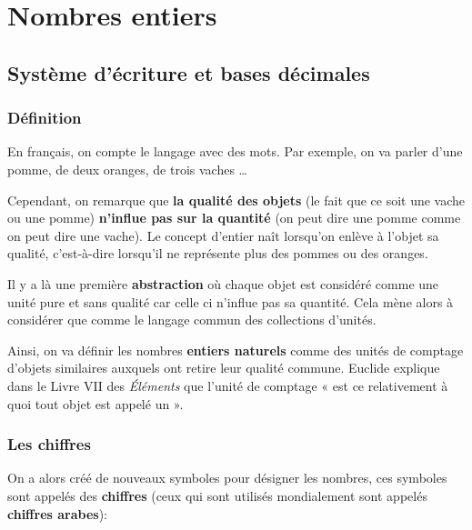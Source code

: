 \chapter{Nombres entiers}

\section{Système d'écriture et bases décimales}

\subsection{Définition}
En français, on compte le langage avec des mots.
Par exemple, on va parler d'une pomme, de deux oranges, de trois vaches \dots

Cependant, on remarque que \textbf{la qualité des objets} (le fait que ce soit une vache ou une pomme) \textbf{n'influe pas sur la quantité} (on peut dire une pomme comme on peut dire une vache). Le concept d'entier naît lorsqu'on enlève à l'objet sa qualité, c'est-à-dire lorsqu'il ne représente plus des pommes ou des oranges.

Il y a là une première \textbf{abstraction} où chaque objet est considéré comme une unité pure et sans qualité car celle ci n'influe pas sa quantité. Cela mène alors à considérer que comme le langage commun des collections d'unités.

Ainsi, on va définir les nombres \textbf{entiers naturels} comme des unités de comptage d'objets similaires auxquels ont retire leur qualité commune. Euclide explique dans le Livre \textrm{VII} des \textit{Éléments} que l'unité de comptage « est ce relativement à quoi tout objet est appelé un ».

\subsection{Les chiffres}
On a alors créé de nouveaux symboles pour désigner les nombres, ces symboles sont appelés des \textbf{chiffres} (ceux qui sont utilisés mondialement sont appelés \textbf{chiffres arabes}):
\vspace{0.5cm}

